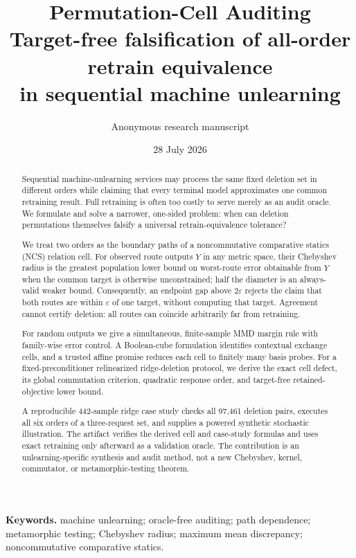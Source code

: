 \documentclass[10pt]{article}
\title{\vspace{-1.6em}
{\color{AuditBlue}\bfseries Permutation-Cell Auditing}\\[0.3em]
\large Target-free falsification of all-order retrain equivalence\\
in sequential machine unlearning}
\author{Anonymous research manuscript}
\date{28 July 2026}
\theoremstyle{definition}
\theoremstyle{remark}
\newcommand{\eps}{\varepsilon}
\begin{document}
\maketitle

\begin{abstract}
Sequential machine-unlearning services may process the same fixed deletion set
in different orders while claiming that every terminal model approximates one
common retraining result. Full retraining is often too costly to serve merely
as an audit oracle. We formulate and solve a narrower, one-sided problem:
when can deletion permutations themselves falsify a universal
retrain-equivalence tolerance?

We treat two orders as the boundary paths of a noncommutative comparative
statics (NCS) relation cell. For observed route outputs \(Y\) in any metric
space, their Chebyshev radius is the greatest population lower bound on
worst-route error obtainable from \(Y\) when the common target is otherwise
unconstrained; half the diameter is an always-valid weaker bound. Consequently,
an endpoint gap above \(2\eps\) rejects the claim that both routes are within
\(\eps\) of one target, without computing that target. Agreement cannot
certify deletion: all routes can coincide arbitrarily far from retraining.

For random outputs we give a simultaneous, finite-sample MMD margin rule with
family-wise error control. A Boolean-cube formulation identifies contextual
exchange cells, and a trusted affine promise reduces each cell to finitely many
basis probes. For a fixed-preconditioner relinearized ridge-deletion protocol,
we derive the exact cell defect, its global commutation criterion, quadratic
response order, and target-free retained-objective lower bound.

A reproducible 442-sample ridge case study checks all 97,461 deletion pairs,
executes all six orders of a three-request set, and supplies a powered
synthetic stochastic illustration. The artifact verifies the derived cell and
case-study formulas and uses exact retraining only afterward as a validation
oracle. The contribution is an
unlearning-specific synthesis and audit method, not a new Chebyshev, kernel,
commutator, or metamorphic-testing theorem.
\end{abstract}

\noindent\textbf{Keywords.}
machine unlearning; oracle-free auditing; path dependence; metamorphic testing;
Chebyshev radius; maximum mean discrepancy; noncommutative comparative statics.
\end{document}
